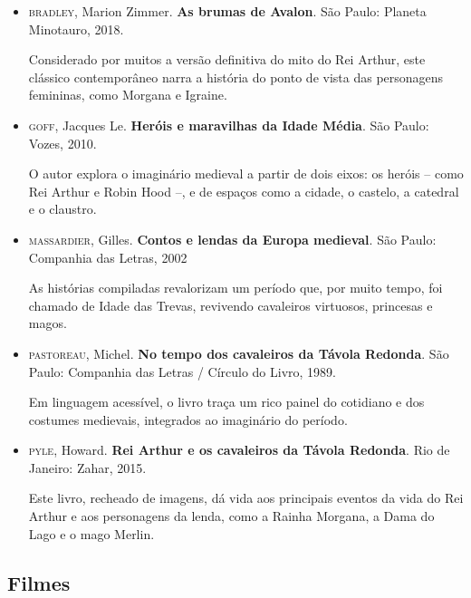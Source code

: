\documentclass{extarticle}
\begin{document}
\begin{itemize}
\item\textsc{bradley}, Marion Zimmer. \textbf{As brumas de Avalon}. São Paulo: Planeta Minotauro, 2018.

  Considerado por muitos a versão definitiva do mito do Rei Arthur, este
  clássico contemporâneo narra a história do ponto de vista das
  personagens femininas, como Morgana e Igraine.

\item\textsc{goff}, Jacques Le. \textbf{Heróis e maravilhas da Idade Média}. São
Paulo: Vozes, 2010.

  O autor explora o imaginário medieval a partir de dois eixos: os
  heróis -- como Rei Arthur e Robin Hood --, e de espaços como a cidade,
  o castelo, a catedral e o claustro.

\item\textsc{massardier}, Gilles. \textbf{Contos e lendas da Europa medieval}. São
Paulo: Companhia das Letras, 2002

  As histórias compiladas revalorizam um período que, por muito tempo,
  foi chamado de Idade das Trevas, revivendo cavaleiros virtuosos,
  princesas e magos.

\item\textsc{pastoreau}, Michel. \textbf{No tempo dos cavaleiros da Távola Redonda}. São Paulo: Companhia das Letras / Círculo do Livro, 1989.

  Em linguagem acessível, o livro traça um rico painel do cotidiano e
  dos costumes medievais, integrados ao imaginário do período.

\item\textsc{pyle}, Howard. \textbf{Rei Arthur e os cavaleiros da Távola Redonda}. Rio de Janeiro: Zahar, 2015.

  Este livro, recheado de imagens, dá vida aos principais eventos da
  vida do Rei Arthur e aos personagens da lenda, como a Rainha Morgana,
  a Dama do Lago e o mago Merlin.
\end{itemize}

\subsection{Filmes}
\end{document}
